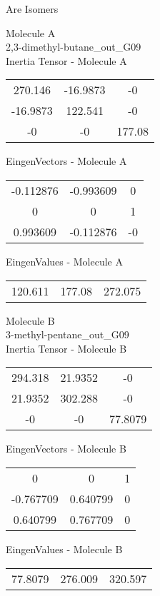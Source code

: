 \begin{center}
\vtab
\vtab
\textcolor{NavyBlue}{\Large Are Isomers}
\end{center}
\newpage
\begin{multicols}{2}
\begin{center}
Molecule A \\ 
2,3-dimethyl-butane\_out\_G09
\\
Inertia Tensor - Molecule A \\
\vtab
\begin{tabular}{|c c c|}
270.146	 & 	-16.9873	 & 	-0	 \\
-16.9873	 & 	122.541	 & 	-0	 \\
-0	 & 	-0	 & 	177.08
\end{tabular}

\vtab
 EingenVectors - Molecule A     \\
\vtab
\begin{tabular}{|c c c|}
-0.112876	 & 	-0.993609	 & 	0	 \\
0	 & 	0	 & 	1	 \\
0.993609	 & 	-0.112876	 & 	-0
\end{tabular}

\vtab
 EingenValues - Molecule A     \\
\vtab
\begin{tabular}{|c c c|}
120.611	 & 	177.08	 & 	272.075
\end{tabular}
\columnbreak

Molecule B \\ 
3-methyl-pentane\_out\_G09
\\
Inertia Tensor - Molecule B \\
\vtab
\begin{tabular}{|c c c|}
294.318	 & 	21.9352	 & 	-0	 \\
21.9352	 & 	302.288	 & 	-0	 \\
-0	 & 	-0	 & 	77.8079
\end{tabular}

\vtab
 EingenVectors - Molecule B     \\
\vtab
\begin{tabular}{|c c c|}
0	 & 	0	 & 	1	 \\
-0.767709	 & 	0.640799	 & 	0	 \\
0.640799	 & 	0.767709	 & 	0
\end{tabular}

\vtab
 EingenValues - Molecule B     \\
\vtab
\begin{tabular}{|c c c|}
77.8079	 & 	276.009	 & 	320.597
\end{tabular}

\end{center}
\end{multicols}
